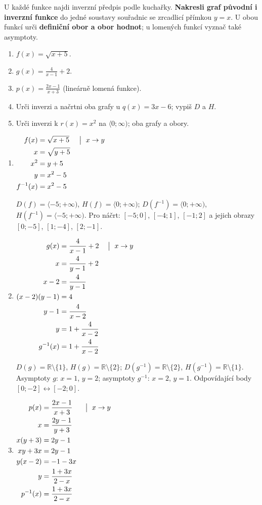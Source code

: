 \documentclass[11pt,a4paper]{article}
\begin{document}
\clearpage
\begin{zadaniReseniBox}[title={Domácí úkol}]
U každé funkce najdi inverzní předpis podle kuchařky. \textbf{Nakresli graf původní i inverzní funkce} do jedné soustavy souřadnic se zrcadlicí přímkou $y=x$. U obou funkcí urči \textbf{definiční obor a obor hodnot}; u lomených funkcí vyznač také asymptoty.
\begin{enumerate}[label=\alph*)]
\item $f(x)=\sqrt{x+5}$.
\item $g(x)=\frac{4}{x-1}+2$.
\item $p(x)=\frac{2x-1}{x+3}$ (lineárně lomená funkce).
\item Urči inverzi a načrtni oba grafy u $q(x)=3x-6$; vypiš $D$ a $H$.
\item Urči inverzi k $r(x)=x^2$ na $\langle0;\infty)$; oba grafy a obory.
\end{enumerate}
\tcblower
\begin{enumerate}[label=\alph*)]
\item
\(\displaystyle\begin{aligned}f(x)&=\sqrt{x+5} &&\bigm|\ x\to y\\x&=\sqrt{y+5}\\x^2&=y+5\\y&=x^2-5\\f^{-1}(x)&=x^2-5\end{aligned}\)

$D(f)=\langle-5;+\infty)$, $H(f)=\langle0;+\infty)$; $D(f^{-1})=\langle0;+\infty)$, $H(f^{-1})=\langle-5;+\infty)$. Pro náčrt: $[-5;0]$, $[-4;1]$, $[-1;2]$ a jejich obrazy $[0;-5]$, $[1;-4]$, $[2;-1]$.
\item
\(\displaystyle\begin{aligned}g(x)&=\frac{4}{x-1}+2 &&\bigm|\ x\to y\\x&=\frac{4}{y-1}+2\\x-2&=\frac{4}{y-1}\\(x-2)(y-1)&=4\\y-1&=\frac{4}{x-2}\\y&=1+\frac{4}{x-2}\\g^{-1}(x)&=1+\frac{4}{x-2}\end{aligned}\)

$D(g)=\mathbb R\setminus\{1\}$, $H(g)=\mathbb R\setminus\{2\}$; $D(g^{-1})=\mathbb R\setminus\{2\}$, $H(g^{-1})=\mathbb R\setminus\{1\}$. Asymptoty $g$: $x=1$, $y=2$; asymptoty $g^{-1}$: $x=2$, $y=1$. Odpovídající body $[0;-2]\leftrightarrow[-2;0]$.
\item
\(\displaystyle\begin{aligned}p(x)&=\frac{2x-1}{x+3} &&\bigm|\ x\to y\\x&=\frac{2y-1}{y+3}\\x(y+3)&=2y-1\\xy+3x&=2y-1\\y(x-2)&=-1-3x\\y&=\frac{1+3x}{2-x}\\p^{-1}(x)&=\frac{1+3x}{2-x}\end{aligned}\)


\end{enumerate}
\end{zadaniReseniBox}
\end{document}

